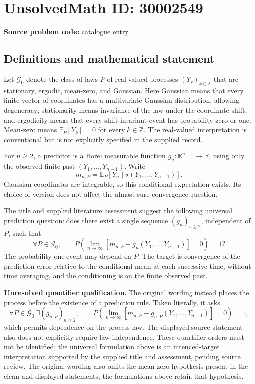 \documentclass[11pt]{article}
\newcommand{\Z}{\mathbb{Z}}
\newcommand{\R}{\mathbb{R}}
\newcommand{\E}{\mathbb{E}}
\begin{document}
\section*{UnsolvedMath ID: 30002549}
\textbf{Source problem code:} catalogue entry
\subsection{Definitions and mathematical statement}
Let \(\mathcal G_0\) denote the class of laws \(P\) of real-valued processes \((Y_k)_{k\in\Z}\) that are stationary, ergodic, mean-zero, and Gaussian. Here Gaussian means that every finite vector of coordinates has a multivariate Gaussian distribution, allowing degeneracy; stationarity means invariance of the law under the coordinate shift; and ergodicity means that every shift-invariant event has probability zero or one. Mean-zero means \(\E_P[Y_k]=0\) for every \(k\in\Z\). The real-valued interpretation is conventional but is not explicitly specified in the supplied record.

For \(n\geq2\), a predictor is a Borel measurable function \(g_n:\R^{n-1}\to\R\), using only the observed finite past \((Y_1,\ldots,Y_{n-1})\). Write
\[
 m_{n,P}=\E_P\!\left[Y_n\mid\sigma(Y_1,\ldots,Y_{n-1})\right].
\]
Gaussian coordinates are integrable, so this conditional expectation exists. Its choice of version does not affect the almost-sure convergence question.

The title and supplied literature assessment suggest the following universal prediction question: does there exist a single sequence \((g_n)_{n\geq2}\), independent of \(P\), such that
\[
 \forall P\in\mathcal G_0,\qquad
 P\!\left(\lim_{n\to\infty}\left[m_{n,P}-g_n(Y_1,\ldots,Y_{n-1})\right]=0\right)=1?
\]
The probability-one event may depend on \(P\). The target is convergence of the prediction error relative to the conditional mean at each successive time, without time averaging, and the conditioning is on the finite observed past.

\textbf{Unresolved quantifier qualification.} The original wording instead places the process before the existence of a prediction rule. Taken literally, it asks
\[
 \forall P\in\mathcal G_0\ \exists(g_{n,P})_{n\geq2},\qquad
 P\!\left(\lim_{n\to\infty}\left[m_{n,P}-g_{n,P}(Y_1,\ldots,Y_{n-1})\right]=0\right)=1,
\]
which permits dependence on the process law. The displayed source statement also does not explicitly require law independence. These quantifier orders must not be identified; the universal formulation above is an intended-target interpretation supported by the supplied title and assessment, pending source review. The original wording also omits the mean-zero hypothesis present in the clean and displayed statements; the formulations above retain that hypothesis.
\end{document}

